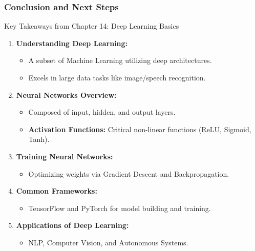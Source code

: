 \documentclass[aspectratio=169]{beamer}
\begin{document}
\begin{frame}[fragile]
  \frametitle{Conclusion and Next Steps}

  \begin{block}{Key Takeaways from Chapter 14: Deep Learning Basics}
    \begin{enumerate}
      \item \textbf{Understanding Deep Learning:}
        \begin{itemize}
          \item A subset of Machine Learning utilizing deep architectures.
          \item Excels in large data tasks like image/speech recognition.
        \end{itemize}
      \item \textbf{Neural Networks Overview:}
        \begin{itemize}
          \item Composed of input, hidden, and output layers.
          \item \textbf{Activation Functions:} Critical non-linear functions (ReLU, Sigmoid, Tanh).
        \end{itemize}
      \item \textbf{Training Neural Networks:}
        \begin{itemize}
          \item Optimizing weights via Gradient Descent and Backpropagation.
        \end{itemize}
      \item \textbf{Common Frameworks:}
        \begin{itemize}
          \item TensorFlow and PyTorch for model building and training.
        \end{itemize}
      \item \textbf{Applications of Deep Learning:}
        \begin{itemize}
          \item NLP, Computer Vision, and Autonomous Systems.
        \end{itemize}
    \end{enumerate}
  \end{block}
\end{frame}
\end{document}
